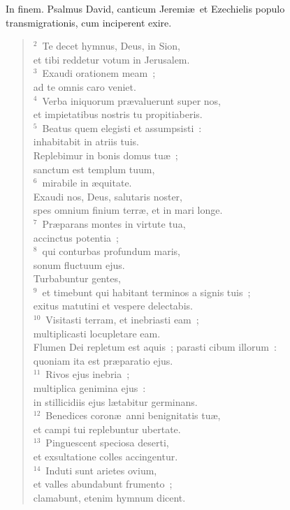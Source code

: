 \bchapter
\lettrine[lines=3,image=true,loversize=0.05,lraise=-0.03]{I}{}n finem. Psalmus David, canticum Jeremi\ae\ et Ezechielis populo transmigrationis, cum inciperent exire.
\begin{flushleft}\begin{verse}\vspace{6pt}${}^{2}$~Te decet hymnus, Deus, in Sion,\\ et tibi reddetur votum in Jerusalem.\\
${}^{3}$~Exaudi orationem meam~;\\ ad te omnis caro veniet.\\
${}^{4}$~Verba iniquorum pr\ae valuerunt super nos,\\ et impietatibus nostris tu propitiaberis.\\
${}^{5}$~Beatus quem elegisti et assumpsisti~:\\ inhabitabit in atriis tuis.\\ Replebimur in bonis domus tu\ae~;\\ sanctum est templum tuum,\\
${}^{6}$~mirabile in \ae quitate.\\ Exaudi nos, Deus, salutaris noster,\\ spes omnium finium terr\ae , et in mari longe.\\
${}^{7}$~Pr\ae parans montes in virtute tua,\\ accinctus potentia~;\\
${}^{8}$~qui conturbas profundum maris,\\ sonum fluctuum ejus.\\ Turbabuntur gentes,\\
${}^{9}$~et timebunt qui habitant terminos a signis tuis~;\\ exitus matutini et vespere delectabis.\\
${}^{10}$~Visitasti terram, et inebriasti eam~;\\ multiplicasti locupletare eam.\\ Flumen Dei repletum est aquis~; parasti cibum illorum~:\\ quoniam ita est pr\ae paratio ejus.\\
${}^{11}$~Rivos ejus inebria~;\\ multiplica genimina ejus~:\\ in stillicidiis ejus l\ae tabitur germinans.\\
${}^{12}$~Benedices coron\ae\ anni benignitatis tu\ae ,\\ et campi tui replebuntur ubertate.\\
${}^{13}$~Pinguescent speciosa deserti,\\ et exsultatione colles accingentur.\\
${}^{14}$~Induti sunt arietes ovium,\\ et valles abundabunt frumento~;\\ clamabunt, etenim hymnum dicent.\end{verse}\end{flushleft}



